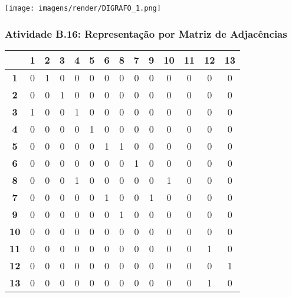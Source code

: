 \documentclass[a4paper,12pt]{article}
\begin{document}
\begin{center}
    \texttt{[image: imagens/render/DIGRAFO\_1.png]}
\end{center}

\subsubsection*{Atividade B.16: Representação por Matriz de Adjacências}
\begin{center}
\tiny
\begin{tabular*}{\textwidth}{c|@{\extracolsep{\fill}}ccccccccccccc}
\rowcolor[gray]{0.9}
 & \textbf{1} & \textbf{2} & \textbf{3} & \textbf{4} & \textbf{5} & \textbf{6} & \textbf{8} & \textbf{7} & \textbf{9} & \textbf{10} & \textbf{11} & \textbf{12} & \textbf{13} \\
\hline
\textbf{1} & 0 & 1 & 0 & 0 & 0 & 0 & 0 & 0 & 0 & 0 & 0 & 0 & 0 \\
\textbf{2} & 0 & 0 & 1 & 0 & 0 & 0 & 0 & 0 & 0 & 0 & 0 & 0 & 0 \\
\textbf{3} & 1 & 0 & 0 & 1 & 0 & 0 & 0 & 0 & 0 & 0 & 0 & 0 & 0 \\
\textbf{4} & 0 & 0 & 0 & 0 & 1 & 0 & 0 & 0 & 0 & 0 & 0 & 0 & 0 \\
\textbf{5} & 0 & 0 & 0 & 0 & 0 & 1 & 1 & 0 & 0 & 0 & 0 & 0 & 0 \\
\textbf{6} & 0 & 0 & 0 & 0 & 0 & 0 & 0 & 1 & 0 & 0 & 0 & 0 & 0 \\
\textbf{8} & 0 & 0 & 0 & 1 & 0 & 0 & 0 & 0 & 0 & 1 & 0 & 0 & 0 \\
\textbf{7} & 0 & 0 & 0 & 0 & 0 & 1 & 0 & 0 & 1 & 0 & 0 & 0 & 0 \\
\textbf{9} & 0 & 0 & 0 & 0 & 0 & 0 & 1 & 0 & 0 & 0 & 0 & 0 & 0 \\
\textbf{10} & 0 & 0 & 0 & 0 & 0 & 0 & 0 & 0 & 0 & 0 & 0 & 0 & 0 \\
\textbf{11} & 0 & 0 & 0 & 0 & 0 & 0 & 0 & 0 & 0 & 0 & 0 & 1 & 0 \\
\textbf{12} & 0 & 0 & 0 & 0 & 0 & 0 & 0 & 0 & 0 & 0 & 0 & 0 & 1 \\
\textbf{13} & 0 & 0 & 0 & 0 & 0 & 0 & 0 & 0 & 0 & 0 & 0 & 1 & 0 \\
\end{tabular*}
\end{center}
\end{document}
